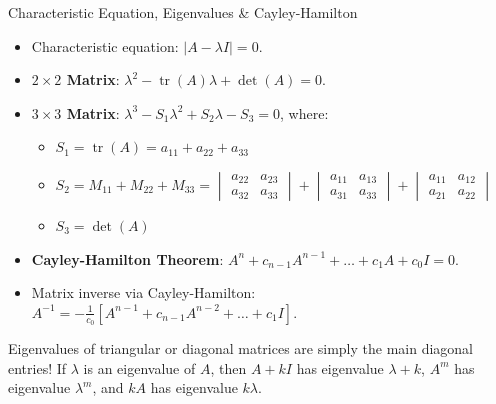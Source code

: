 \begin{formulabox}{Characteristic Equation, Eigenvalues \& Cayley-Hamilton}
\begin{itemize}
    \item Characteristic equation: $|A - \lambda I| = 0$.
    \item \textbf{$2 \times 2$ Matrix}: $\lambda^2 - \operatorname{tr}(A)\lambda + \det(A) = 0$.
    \item \textbf{$3 \times 3$ Matrix}: $\lambda^3 - S_1 \lambda^2 + S_2 \lambda - S_3 = 0$, where:
    \begin{itemize}
        \item $S_1 = \operatorname{tr}(A) = a_{11} + a_{22} + a_{33}$
        \item $S_2 = M_{11} + M_{22} + M_{33} = \begin{vmatrix} a_{22} & a_{23} \\ a_{32} & a_{33} \end{vmatrix} + \begin{vmatrix} a_{11} & a_{13} \\ a_{31} & a_{33} \end{vmatrix} + \begin{vmatrix} a_{11} & a_{12} \\ a_{21} & a_{22} \end{vmatrix}$
        \item $S_3 = \det(A)$
    \end{itemize}
    \item \textbf{Cayley-Hamilton Theorem}: $A^n + c_{n-1}A^{n-1} + \dots + c_1 A + c_0 I = 0$.
    \item Matrix inverse via Cayley-Hamilton: $A^{-1} = -\frac{1}{c_0}[A^{n-1} + c_{n-1}A^{n-2} + \dots + c_1 I]$.
\end{itemize}
\end{formulabox}

\begin{memorytip}
Eigenvalues of triangular or diagonal matrices are simply the main diagonal entries! If $\lambda$ is an eigenvalue of $A$, then $A + kI$ has eigenvalue $\lambda + k$, $A^m$ has eigenvalue $\lambda^m$, and $kA$ has eigenvalue $k\lambda$.
\end{memorytip}
